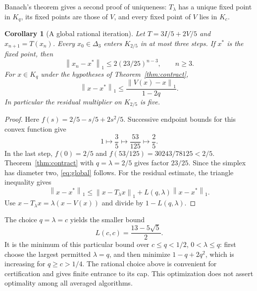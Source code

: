 \documentclass[11pt]{amsart}
\newtheorem{corollary}[theorem]{Corollary}
\theoremstyle{definition}
\newcommand{\D}{\Delta_3}
\newcommand{\norm}[1]{\left\lVert#1\right\rVert_1}
\begin{document}
Banach's theorem gives a second proof of uniqueness: $T_\lambda$ has a unique fixed point in $K_q$, its fixed points are those of $V$, and every fixed point of $V$ lies in $K_c$.

\begin{corollary}[A global rational iteration]\label{cor:global}
Let $T=3I/5+2V/5$ and $x_{n+1}=T(x_n)$. Every $x_0\in\D$ enters $K_{2/5}$ in at most three steps. If $x^*$ is the fixed point, then
\begin{equation}\label{eq:global}
 \norm{x_n-x^*}\le2(23/25)^{n-3},\qquad n\ge3.
\end{equation}
For $x\in K_q$ under the hypotheses of Theorem~\ref{thm:contract},
\begin{equation}\label{eq:residual}
 \norm{x-x^*}\le\frac{\norm{V(x)-x}}{1-2q}.
\end{equation}
In particular the residual multiplier on $K_{2/5}$ is five.
\end{corollary}
\begin{proof}
Here $f(s)=2/5-s/5+2s^2/5$. Successive endpoint bounds for this convex function give
\[
 1\longmapsto\frac35\longmapsto\frac{53}{125}\longmapsto\frac25.
\]
In the last step, $f(0)=2/5$ and $f(53/125)=30243/78125<2/5$. Theorem~\ref{thm:contract} with $q=\lambda=2/5$ gives factor $23/25$. Since the simplex has diameter two, \eqref{eq:global} follows. For the residual estimate, the triangle inequality gives
\[
 \norm{x-x^*}\le\norm{x-T_\lambda x}
       +L(q,\lambda)\norm{x-x^*}.
\]
Use $x-T_\lambda x=\lambda(x-V(x))$ and divide by $1-L(q,\lambda)$.
\end{proof}

The choice $q=\lambda=c$ yields the smaller bound
\[
 L(c,c)=\frac{13-5\sqrt5}{2}.
\]
It is the minimum of this particular bound over $c\le q<1/2$, $0<\lambda\le q$: first choose the largest permitted $\lambda=q$, and then minimize $1-q+2q^2$, which is increasing for $q\ge c>1/4$. The rational choice above is convenient for certification and gives finite entrance to its cap. This optimization does not assert optimality among all averaged algorithms.
\end{document}
